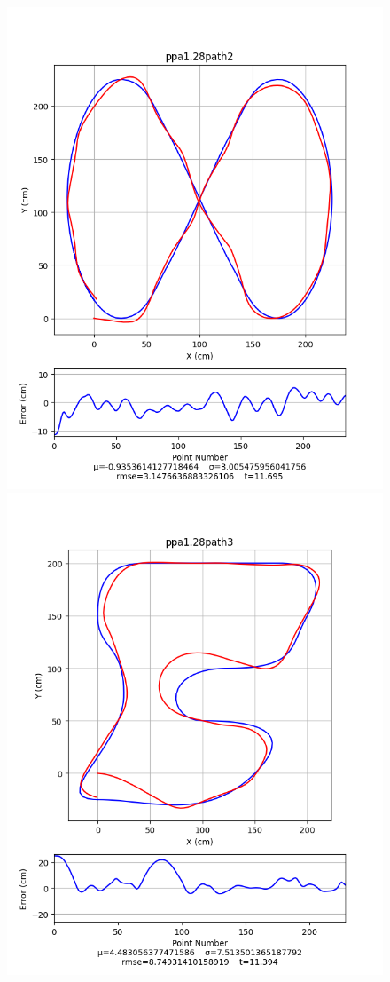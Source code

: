 \documentclass[12pt]{article}
\begin{document}
\begin{flushleft}
\begin{figure}[H]
\includegraphics[width=\linewidth]{images/pathData/ppa1path2}
\endminipage\\
\includegraphics[width=\linewidth]{images/pathData/ppa1path3}

\end{figure}
\end{flushleft}
\end{document}

